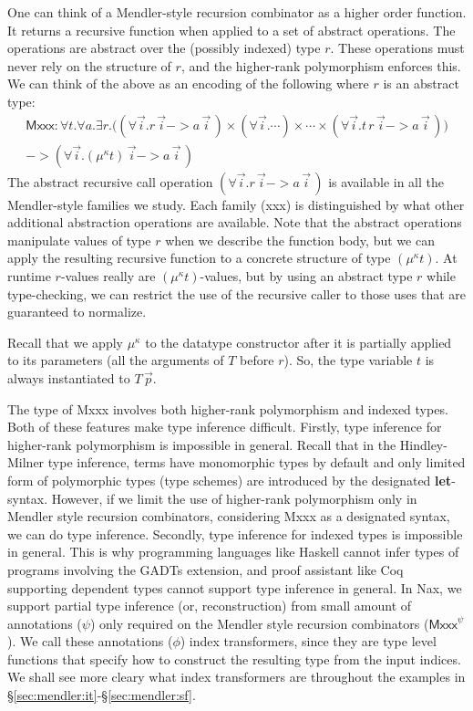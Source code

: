 One can think of a Mendler-style recursion combinator as a higher order
function. It returns a recursive function when applied
to a set of abstract operations. The operations are abstract over the 
(possibly indexed) type $r$. These operations must never rely on the structure
of $r$, and the higher-rank polymorphism enforces this.
We can think of the above as an encoding of the following
where $r$ is an abstract type:
\begin{multline*}
 \textsf{Mxxx} : \forall t . \forall a .
 \exists r.
  \big(  (\forall\vec{i} . r\,\vec{i} -> a\,\vec{i}\,)
   \times (\forall\vec{i} . \cdots) \times \cdots
   \times (\forall\vec{i} . t\, r\,\vec{i} -> a\,\vec{i}\,)
   \big) \\
 -> (\forall\vec{i} . (\mu^\kappa t)\,\vec{i} -> a\,\vec{i}\,)
\end{multline*}
The abstract recursive call operation $(\forall\vec{i} . r\,\vec{i} -> a\,\vec{i}\,)$ is available in
all the Mendler-style families we study. Each family (\textsf{xxx})
is distinguished by what other additional abstraction operations are available.
Note that the abstract operations manipulate values of type $r$ when we describe
the function body, but we can apply the resulting recursive function
to a concrete structure of type $(\mu^\kappa t)$. At runtime
$r$-values really are $(\mu^\kappa t)$-values, but
by using an abstract type $r$ while type-checking, we
can restrict the use of the recursive caller to those uses that are guaranteed to normalize. 

Recall that we apply
$\mu^\kappa$ to the datatype constructor after it is partially applied to its parameters 
(all the arguments of $T$ before $r$). So, the type variable $t$ is always
instantiated to $T\,\vec{p}$.

The type of \textsf{Mxxx} involves both higher-rank polymorphism and
indexed types. Both of these features make type inference difficult.
Firstly, type inference for higher-rank polymorphism is impossible in general.
Recall that in the Hindley-Milner type inference, terms have monomorphic types
by default and only limited form of polymorphic types (type schemes) are
introduced by the designated \textbf{let}-syntax.  However, if we limit
the use of higher-rank polymorphism only in Mendler style recursion combinators,
considering \textsf{Mxxx} as a designated syntax, we can do type inference.
Secondly, type inference for indexed types is impossible in general.
This is why programming languages like Haskell cannot infer types of programs
involving the GADTs extension, and proof assistant like Coq supporting
dependent types cannot support type inference in general. In Nax, we support
partial type inference (or, reconstruction) from small amount of annotations
($\psi$) only required on the Mendler style recursion combinators
($\textsf{Mxxx}^\psi$). We call these annotations ($\phi$) index transformers,
since they are type level functions that specify how to construct
the resulting type from the input indices. We shall see more cleary
what index transformers are throughout the examples in
\S\ref{sec:mendler:it}-\S\ref{sec:mendler:sf}.

